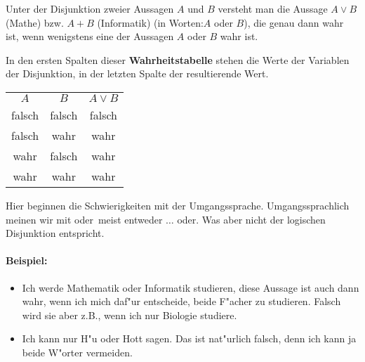 \begin{definition}[Disjunktion]
Unter der Disjunktion zweier Aussagen $A$ und $B$ versteht man die Aussage $A \lor B$ (Mathe) bzw. $A + B$ (Informatik) (in Worten:\glqq $A$ oder $B$\grqq ), die genau dann wahr ist, wenn wenigstens eine der Aussagen $A$ oder $B$ wahr ist.
\end{definition}
In den ersten Spalten dieser \textbf{Wahrheitstabelle} stehen die Werte der Variablen der Disjunktion, in der letzten Spalte der resultierende Wert.
\begin{center}
\begin{tabular}{c|c||c}
$A$& $B$  &  $A \lor B$  \\ 
 \cellcolor{ared}falsch & \cellcolor{ared} falsch & \cellcolor{ared}falsch   \\ 
 \cellcolor{ared}falsch & \cellcolor{agreen}wahr & \cellcolor{agreen}wahr  \\ 
 \cellcolor{agreen}wahr & \cellcolor{ared} falsch & \cellcolor{agreen}wahr   \\ 
\cellcolor{agreen}wahr & \cellcolor{agreen}wahr & \cellcolor{agreen}wahr  \\ 
\hline
\end{tabular}
\end{center}
Hier beginnen die Schwierigkeiten mit der Umgangssprache. Umgangssprachlich meinen wir mit \glqq oder\grqq \ meist \glqq entweder $\ldots$ oder\grqq . Was aber nicht der logischen Disjunktion entspricht.

\paragraph*{Beispiel:}
\begin{itemize}
	\item \glqq Ich werde Mathematik oder Informatik studieren\grqq , diese Aussage ist auch dann wahr, wenn ich mich daf"ur entscheide, beide F"acher zu studieren. Falsch wird sie aber z.B., wenn ich nur Biologie studiere.
	\item \glqq Ich kann nur H"u oder Hott sagen\grqq . Das ist nat"urlich falsch, denn ich kann ja beide W"orter vermeiden.
\end{itemize}

